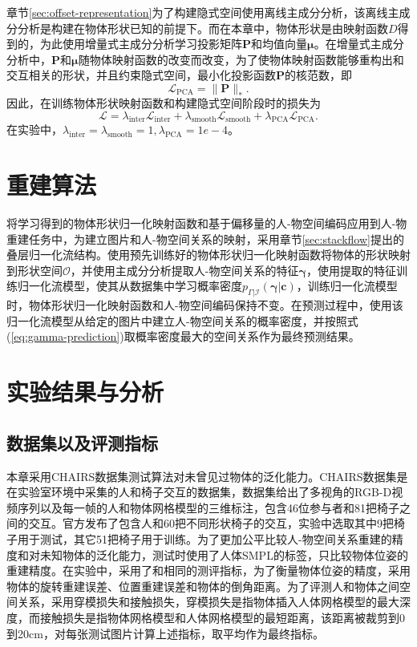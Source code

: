 章节\ref{sec:offset-representation}为了构建隐式空间使用离线主成分分析，该离线主成分分析是构建在物体形状已知的前提下。而在本章中，物体形状是由映射函数$D$得到的，为此使用增量式主成分分析\citep{Ross2008IncrementalLF}学习投影矩阵$\mathbf{P}$和均值向量$\mathbf{\mu}$。在增量式主成分分析中，$\mathbf{P}$和$\mathbf{\mu}$随物体映射函数的改变而改变，为了使物体映射函数能够重构出和交互相关的形状，并且约束隐式空间，最小化投影函数$\mathbf{P}$的核范数，即
\begin{equation}
	\mathcal{L}_{\text{PCA}} = \| \mathbf{P} \|_*.
\end{equation}
因此，在训练物体形状映射函数和构建隐式空间阶段时的损失为
\begin{equation}
	\mathcal{L} = \lambda_{\text{inter}} \mathcal{L}_{\text{inter}} + \lambda_{\text{smooth}} \mathcal{L}_{\text{smooth}} + \lambda_{\text{PCA}} \mathcal{L}_{\text{PCA}}.
\end{equation}
在实验中，$\lambda_{\text{inter}} = \lambda_{\text{smooth}} = 1, \lambda_{\text{PCA}} = 1e-4$。

\section{重建算法}
将学习得到的物体形状归一化映射函数和基于偏移量的人-物空间编码应用到人-物重建任务中，为建立图片和人-物空间关系的映射，采用章节\ref{sec:stackflow}提出的叠层归一化流结构。使用预先训练好的物体形状归一化映射函数将物体的形状映射到形状空间$\mathcal{O}$，并使用主成分分析提取人-物空间关系的特征$\mathbf{\gamma}$，使用提取的特征训练归一化流模型，使其从数据集中学习概率密度$p_{\Gamma|\mathcal{I}}(\mathbf{\gamma}|\mathbf{c})$，训练归一化流模型时，物体形状归一化映射函数和人-物空间编码保持不变。在预测过程中，使用该归一化流模型从给定的图片中建立人-物空间关系的概率密度，并按照式(\ref{eq:gamma-prediction})取概率密度最大的空间关系作为最终预测结果。

\section{实验结果与分析}

\subsection{数据集以及评测指标}
本章采用CHAIRS数据集\citep{Jiang2022FullBodyAH}测试算法对未曾见过物体的泛化能力。CHAIRS数据集是在实验室环境中采集的人和椅子交互的数据集，数据集给出了多视角的RGB-D视频序列以及每一帧的人和物体网格模型的三维标注，包含46位参与者和81把椅子之间的交互。官方发布了包含人和60把不同形状椅子的交互，实验中选取其中9把椅子用于测试，其它51把椅子用于训练。为了更加公平比较人-物空间关系重建的精度和对未知物体的泛化能力，测试时使用了人体SMPL的标签，只比较物体位姿的重建精度。在实验中，采用了和\citep{Jiang2022FullBodyAH}相同的测评指标，为了衡量物体位姿的精度，采用物体的旋转重建误差、位置重建误差和物体的倒角距离。为了评测人和物体之间空间关系，采用穿模损失和接触损失，穿模损失是指物体插入人体网格模型的最大深度，而接触损失是指物体网格模型和人体网格模型的最短距离，该距离被裁剪到0到20cm，对每张测试图片计算上述指标，取平均作为最终指标。

